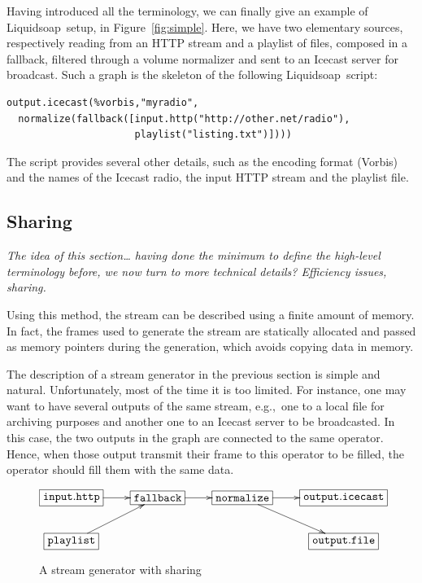 \documentclass{llncs}
\newcommand{\liquidsoap}{Liquidsoap}
\newcommand{\eg}{{e.g.,}}
\begin{document}
Having introduced all the terminology, we can finally give an example of 
\liquidsoap\ setup, in Figure~\ref{fig:simple}.
Here, we have two elementary sources, respectively reading from an HTTP stream 
and a playlist of files, composed in a fallback, filtered through a volume
normalizer and sent to an Icecast server for broadcast. %
Such a graph is the skeleton of the following \liquidsoap\ script:
\begin{verbatim}
output.icecast(%vorbis,"myradio",
  normalize(fallback([input.http("http://other.net/radio"),
                      playlist("listing.txt")])))
\end{verbatim}
The script provides several other details, such as the encoding format 
(Vorbis) and the names of the Icecast radio, the input HTTP stream
and the playlist file.

\subsection{Sharing}

\emph{The idea of this section\ldots
having done the minimum to define the high-level terminology before,
we now turn to more technical details?
Efficiency issues, sharing.}

Using this method, the stream can be described using a finite amount of memory. In fact, the frames used
to generate the stream are statically allocated and passed as memory pointers during the generation, which 
avoids copying data in memory.

The description of a stream generator in the previous section is simple and 
natural. Unfortunately, most of the time it is too limited. For instance, one 
may want to have several outputs of the same 
stream, \eg\ one to a local file for archiving purposes and another one to an Icecast server to be
broadcasted.
In this case, the two outputs in the graph are connected to the same operator. Hence, when those output
transmit their frame to this operator to be filled, the operator should fill them with the same data.

\begin{figure}[htn]
 \begin{center}
\[
\xymatrix{
  *+[F]{\mathtt{input.http}}\ar[r]&*+[F]{\mathtt{fallback}}\ar[r]&
  *+[F]{\mathtt{normalize}}\ar[r]\ar[dr]&
  *+[F]{\mathtt{output.icecast}}\\
  *+[F]{\mathtt{playlist}}\ar[ur]& & & *+[F]{\mathtt{output.file}}\\
}
\]
\end{center}
 \caption{A stream generator with sharing}
\end{figure}
\end{document}
